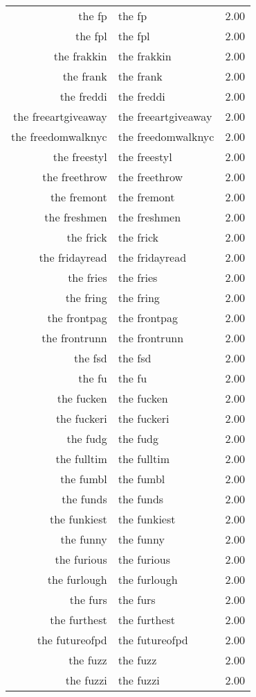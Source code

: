 \begin{table}[ht]
\begin{tabular}{rlr}
  the fp & the fp & 2.00 \\ 
  the fpl & the fpl & 2.00 \\ 
  the frakkin & the frakkin & 2.00 \\ 
  the frank & the frank & 2.00 \\ 
  the freddi & the freddi & 2.00 \\ 
  the freeartgiveaway & the freeartgiveaway & 2.00 \\ 
  the freedomwalknyc & the freedomwalknyc & 2.00 \\ 
  the freestyl & the freestyl & 2.00 \\ 
  the freethrow & the freethrow & 2.00 \\ 
  the fremont & the fremont & 2.00 \\ 
  the freshmen & the freshmen & 2.00 \\ 
  the frick & the frick & 2.00 \\ 
  the fridayread & the fridayread & 2.00 \\ 
  the fries & the fries & 2.00 \\ 
  the fring & the fring & 2.00 \\ 
  the frontpag & the frontpag & 2.00 \\ 
  the frontrunn & the frontrunn & 2.00 \\ 
  the fsd & the fsd & 2.00 \\ 
  the fu & the fu & 2.00 \\ 
  the fucken & the fucken & 2.00 \\ 
  the fuckeri & the fuckeri & 2.00 \\ 
  the fudg & the fudg & 2.00 \\ 
  the fulltim & the fulltim & 2.00 \\ 
  the fumbl & the fumbl & 2.00 \\ 
  the funds & the funds & 2.00 \\ 
  the funkiest & the funkiest & 2.00 \\ 
  the funny & the funny & 2.00 \\ 
  the furious & the furious & 2.00 \\ 
  the furlough & the furlough & 2.00 \\ 
  the furs & the furs & 2.00 \\ 
  the furthest & the furthest & 2.00 \\ 
  the futureofpd & the futureofpd & 2.00 \\ 
  the fuzz & the fuzz & 2.00 \\ 
  the fuzzi & the fuzzi & 2.00 \\ 

\end{tabular}
\end{table}
